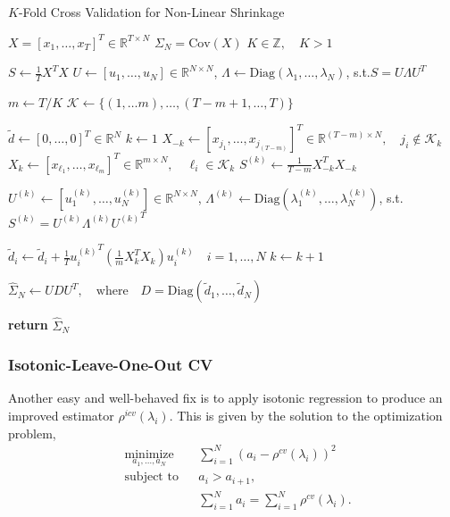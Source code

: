 \documentclass{article}
\begin{document}
\begin{algorithm}
	\caption{$K$-Fold Cross Validation for Non-Linear Shrinkage}
	\label{alg:nls_kcv}
	\begin{algorithmic}[1]
	\Require $X = [x_1, \ldots, x_T]^T \in \mathbb{R}^{T\times N}$
	\Require $\Sigma_N = \mathrm{Cov}(X)$
	\Require $K \in \mathbb{Z}, \quad K > 1$

		\State $S \gets \frac1T X^T X$
		\State 
				$U \gets [u_1, \ldots, u_N] \in \mathbb{R}^{N\times N}$,
				\quad $\Lambda \gets \mathrm{Diag}(\lambda_1, \ldots, \lambda_N)$,
				\quad \mbox{s.t.}\quad $S = U \Lambda {U}^T$

		\State $m \gets T / K$
		\State $\mathcal{K} \gets \{(1, \ldots m), \ldots, (T-m+1, \ldots, T)\}$

		\State $\tilde{d} \gets [0, \ldots, 0]^T \in \mathbb{R}^{N}$
		\State $k \gets 1$
			\State $X_{-k} \gets [x_{j_1}, \ldots, x_{j_{(T-m)}}]^T \in \mathbb{R}^{(T-m)\times N}, 
				\quad j_i \notin \mathcal{K}_k$
			\State $X_{k} \gets [x_{\ell_1}, \ldots, x_{\ell_m}]^T \in \mathbb{R}^{m\times N}, 
				\quad \ell_i \in \mathcal{K}_k$
			\State $S^{(k)} \gets \frac{1}{T-m} X_{-k}^T X_{-k} $

			\State 
				$U^{(k)} \gets [u^{(k)}_1, \ldots, u^{(k)}_N] \in \mathbb{R}^{N\times N}$,
				\quad $\Lambda^{(k)} 
					\gets \mathrm{Diag}(\lambda^{(k)}_1, \ldots, \lambda^{(k)}_N)$,
				\quad \mbox{s.t.}\quad $S^{(k)} = U^{(k)} \Lambda^{(k)} {U^{(k)}}^T$


			\State $\tilde{d}_i \gets \tilde{d}_i 
				+ \frac1T {u^{(k)}_i}^T (\frac1m X_{k}^T X_{k}) u^{(k)}_i 
				\quad i = 1, \ldots, N$
			\State $k \gets k+1$
		\EndWhile

		\State $\hat{\Sigma}_N \gets UDU^T, \quad 
			\mbox{where}\quad D = \mathrm{Diag}(\tilde{d}_1, \ldots, \tilde{d}_N)$

		\State \textbf{return} $\hat{\Sigma}_N$ 
	\EndProcedure
	\end{algorithmic}
\end{algorithm}

\subsubsection{Isotonic-Leave-One-Out CV}\label{sec:icv}

Another easy and well-behaved fix is to apply isotonic regression to produce an
improved estimator $\rho^{icv}(\lambda_i)$.   This is given by the solution to
the optimization problem,
\begin{equation*}
  \begin{aligned}
    & \underset{a_1, \ldots, a_N}{\text{minimize}}
    & & \sum_{i=1}^N (a_i - \rho^{cv}(\lambda_i))^2 \\
    & \text{subject to}
    & & a_i > a_{i+1},\\
    & & & \sum_{i=1}^N a_i = \sum_{i=1}^N \rho^{cv}(\lambda_i).
  \end{aligned}
\end{equation*}
\end{document}
